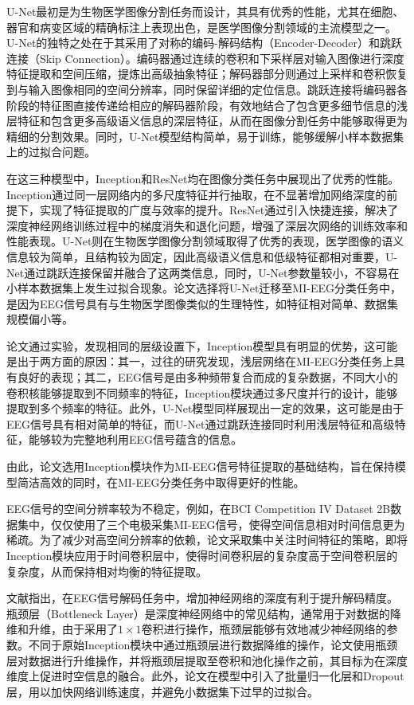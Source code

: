 U-Net\cite{ronneberger2015u}最初是为生物医学图像分割任务而设计，其具有优秀的性能，尤其在细胞、器官和病变区域的精确标注上表现出色，是医学图像分割领域的主流模型之一。U-Net的独特之处在于其采用了对称的编码-解码结构（Encoder-Decoder）和跳跃连接（Skip Connection）。编码器通过连续的卷积和下采样层对输入图像进行深度特征提取和空间压缩，提炼出高级抽象特征；解码器部分则通过上采样和卷积恢复到与输入图像相同的空间分辨率，同时保留详细的定位信息。跳跃连接将编码器各阶段的特征图直接传递给相应的解码器阶段，有效地结合了包含更多细节信息的浅层特征和包含更多高级语义信息的深层特征，从而在图像分割任务中能够取得更为精细的分割效果。同时，U-Net模型结构简单，易于训练，能够缓解小样本数据集上的过拟合问题。

在这三种模型中，Inception和ResNet均在图像分类任务中展现出了优秀的性能。Inception通过同一层网络内的多尺度特征并行抽取，在不显著增加网络深度的前提下，实现了特征提取的广度与效率的提升。ResNet通过引入快捷连接，解决了深度神经网络训练过程中的梯度消失和退化问题，增强了深层次网络的训练效率和性能表现。U-Net则在生物医学图像分割领域取得了优秀的表现，医学图像的语义信息较为简单，且结构较为固定，因此高级语义信息和低级特征都相对重要，U-Net通过跳跃连接保留并融合了这两类信息，同时，U-Net参数量较小，不容易在小样本数据集上发生过拟合现象。论文选择将U-Net迁移至MI-EEG分类任务中，是因为EEG信号具有与生物医学图像类似的生理特性，如特征相对简单、数据集规模偏小等。

论文通过实验，发现相同的层级设置下，Inception模型具有明显的优势，这可能是出于两方面的原因：其一，过往的研究发现，浅层网络在MI-EEG分类任务上具有良好的表现；其二，EEG信号是由多种频带复合而成的复杂数据，不同大小的卷积核能够提取到不同频率的特征，Inception模块通过多尺度并行的设计，能够提取到多个频率的特征。此外，U-Net模型同样展现出一定的效果，这可能是由于EEG信号具有相对简单的特征，而U-Net通过跳跃连接同时利用浅层特征和高级特征，能够较为完整地利用EEG信号蕴含的信息。

由此，论文选用Inception模块作为MI-EEG信号特征提取的基础结构，旨在保持模型简洁高效的同时，在MI-EEG分类任务中取得更好的性能。

EEG信号的空间分辨率较为不稳定，例如，在BCI Competition IV Dataset 2B数据集\cite{tangermann2012review}中，仅仅使用了三个电极采集MI-EEG信号，使得空间信息相对时间信息更为稀疏。为了减少对高空间分辨率的依赖，论文采取集中关注时间特征的策略，即将Inception模块应用于时间卷积层中，使得时间卷积层的复杂度高于空间卷积层的复杂度，从而保持相对均衡的特征提取。

文献\cite{schirrmeister2017deep,lawhern2018eegnet}指出，在EEG信号解码任务中，增加神经网络的深度有利于提升解码精度。瓶颈层（Bottleneck Layer）是深度神经网络中的常见结构\cite{he2016deep,huang2017densely}，通常用于对数据的降维和升维，由于采用了\(1\times1\)卷积进行操作，瓶颈层能够有效地减少神经网络的参数。不同于原始Inception模块中通过瓶颈层进行数据降维的操作，论文使用瓶颈层对数据进行升维操作，并将瓶颈层提取至卷积和池化操作之前，其目标为在深度维度上促进时空信息的融合。此外，论文在模型中引入了批量归一化层和Dropout层，用以加快网络训练速度，并避免小数据集下过早的过拟合。

